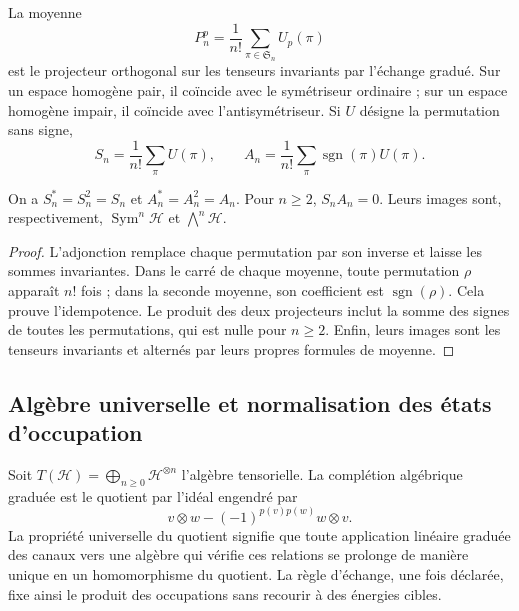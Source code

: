 La moyenne
\[
 P_n^p=\frac1{n!}\sum_{\pi\in\mathfrak S_n}U_p(\pi)
\]
est le projecteur orthogonal sur les tenseurs invariants par
l’échange gradué. Sur un espace homogène pair, il coïncide avec le
symétriseur ordinaire ; sur un espace homogène impair, il coïncide avec
l’antisymétriseur. Si \(U\) désigne la permutation sans signe,
\begin{equation}
 S_n=\frac1{n!}\sum_\pi U(\pi),\qquad
 A_n=\frac1{n!}\sum_\pi\operatorname{sgn}(\pi)U(\pi).
 \label{vi:eq:simetrizadores-fock}
\end{equation}

\begin{proposition}
\label{vi:prop:proyectores-fock}
On a \(S_n^*=S_n^2=S_n\) et \(A_n^*=A_n^2=A_n\).
Pour \(n\ge2\), \(S_nA_n=0\). Leurs images sont, respectivement,
\(\operatorname{Sym}^n\mathcal H\) et \(\bigwedge^n\mathcal H\).
\end{proposition}
\begin{proof}
L’adjonction remplace chaque permutation par son inverse et laisse
les sommes invariantes. Dans le carré de chaque moyenne, toute
permutation \(\rho\) apparaît \(n!\) fois ; dans la seconde moyenne,
son coefficient est \(\operatorname{sgn}(\rho)\). Cela prouve
l’idempotence. Le produit des deux projecteurs inclut la somme
des signes de toutes les permutations, qui est nulle pour
\(n\ge2\). Enfin, leurs images sont les tenseurs invariants
et alternés par leurs propres formules de moyenne.
\end{proof}

\subsection{Algèbre universelle et normalisation des états d’occupation}
\label{vi:subsec:fock-construccion}

Soit \(T(\mathcal H)=\bigoplus_{n\ge0}\mathcal H^{\otimes n}\)
l’algèbre tensorielle. La complétion algébrique graduée est le
quotient par l’idéal engendré par
\begin{equation}
 v\otimes w-(-1)^{p(v)p(w)}w\otimes v.
 \label{vi:eq:ideal-fock}
\end{equation}
La propriété universelle du quotient signifie que toute application
linéaire graduée des canaux vers une algèbre qui vérifie ces
relations se prolonge de manière unique en un homomorphisme du
quotient. La règle d’échange, une fois déclarée, fixe ainsi le
produit des occupations sans recourir à des énergies cibles.

